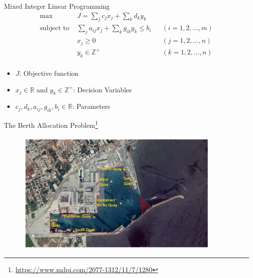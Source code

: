 \documentclass[bigger]{beamer}
\begin{document}
\begin{frame}[label={sec:org531f924}]{Mixed Integer Linear Programming}
\begin{align*}
\text{max }        &J = \sum_j c_j x_j + \sum_k d_k y_k&         &               \\
\text{subject to } &\sum_j a_{ij} x_j + \sum_k g_{ik} y_k \le b_i&  &(i = 1,2,...,m)\\
                  &x_j \ge 0&                              &(j = 1,2,...,n)\\
                  &y_k \in \mathbb{Z^+}&                   &(k = 1,2,...,n)\\
\end{align*}

\begin{itemize}
\item \(J\): Objective function
\item \(x_j \in \mathbb{R}\) and \(y_k \in \mathbb{Z}^+\): Decision Variables
\item \(c_j, d_k, a_{ij}, g_{ik}, b_i \in \mathbb{R}\): Parameters
\end{itemize}
\end{frame}

\begin{frame}[label={sec:orgac9ba57}]{The Berth Allocation Problem\footnote{\url{https://www.mdpi.com/2077-1312/11/7/1280}}}
\begin{figure}[htpb]
\centering
    \includegraphics[width=0.9\textwidth]{img/berthing-sky-picture}
\end{figure}
\end{frame}
\end{document}
